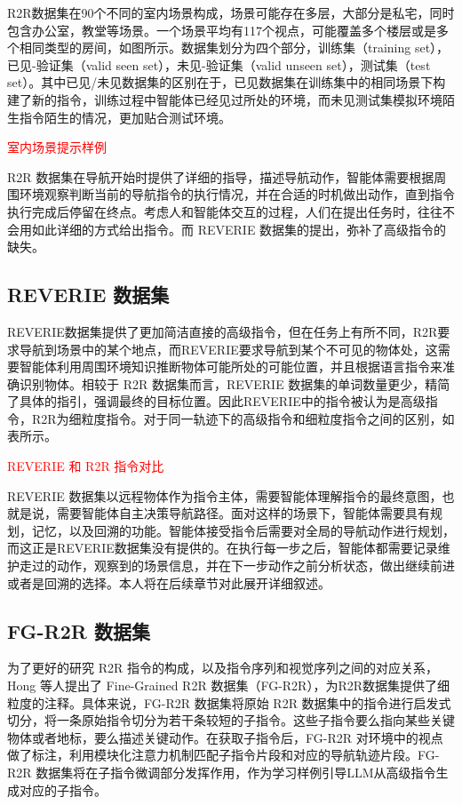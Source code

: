 \documentclass[bachelor]{thesis-uestc}
\begin{document}
R2R数据集在90个不同的室内场景构成，场景可能存在多层，大部分是私宅，同时包含办公室，教堂等场景。一个场景平均有117个视点，可能覆盖多个楼层或是多个相同类型的房间，如图所示。数据集划分为四个部分，训练集（training set），已见-验证集（valid seen set），未见-验证集（valid unseen set），测试集（test set）。其中已见/未见数据集的区别在于，已见数据集在训练集中的相同场景下构建了新的指令，训练过程中智能体已经见过所处的环境，而未见测试集模拟环境陌生指令陌生的情况，更加贴合测试环境。

\textcolor{red}{室内场景提示样例}

R2R 数据集在导航开始时提供了详细的指导，描述导航动作，智能体需要根据周围环境观察判断当前的导航指令的执行情况，并在合适的时机做出动作，直到指令执行完成后停留在终点。考虑人和智能体交互的过程，人们在提出任务时，往往不会用如此详细的方式给出指令。而 REVERIE 数据集的提出，弥补了高级指令的缺失。

\subsection{REVERIE 数据集}
REVERIE数据集提供了更加简洁直接的高级指令，但在任务上有所不同，R2R要求导航到场景中的某个地点，而REVERIE要求导航到某个不可见的物体处，这需要智能体利用周围环境知识推断物体可能所处的可能位置，并且根据语言指令来准确识别物体。相较于 R2R 数据集而言，REVERIE 数据集的单词数量更少，精简了具体的指引，强调最终的目标位置。因此REVERIE中的指令被认为是高级指令，R2R为细粒度指令。对于同一轨迹下的高级指令和细粒度指令之间的区别，如表所示。

\textcolor{red}{REVERIE 和 R2R 指令对比}

REVERIE 数据集以远程物体作为指令主体，需要智能体理解指令的最终意图，也就是说，需要智能体自主决策导航路径。面对这样的场景下，智能体需要具有规划，记忆，以及回溯的功能。智能体接受指令后需要对全局的导航动作进行规划，而这正是REVERIE数据集没有提供的。在执行每一步之后，智能体都需要记录维护走过的动作，观察到的场景信息，并在下一步动作之前分析状态，做出继续前进或者是回溯的选择。本人将在后续章节对此展开详细叙述。

\subsection{FG-R2R 数据集}
为了更好的研究 R2R 指令的构成，以及指令序列和视觉序列之间的对应关系，Hong 等人提出了 Fine-Grained R2R 数据集（FG-R2R），为R2R数据集提供了细粒度的注释。具体来说，FG-R2R 数据集将原始 R2R 数据集中的指令进行启发式切分，将一条原始指令切分为若干条较短的子指令。这些子指令要么指向某些关键物体或者地标，要么描述关键动作。在获取子指令后，FG-R2R 对环境中的视点做了标注，利用模块化注意力机制匹配子指令片段和对应的导航轨迹片段。FG-R2R 数据集将在子指令微调部分发挥作用，作为学习样例引导LLM从高级指令生成对应的子指令。
\end{document}

